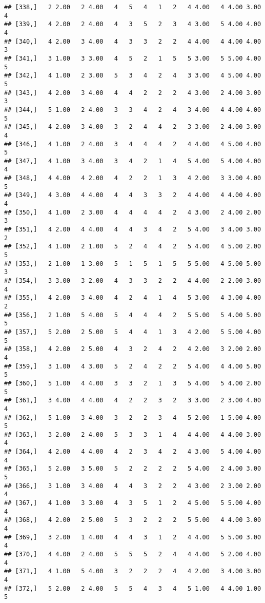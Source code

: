 \documentclass[]{article}
\begin{document}
\begin{verbatim}
## [338,]   2 2.00   2 4.00   4   5   4   1   2   4 4.00   4 4.00 3.00   4
## [339,]   4 2.00   2 4.00   4   3   5   2   3   4 3.00   5 4.00 4.00   4
## [340,]   4 2.00   3 4.00   4   3   3   2   2   4 4.00   4 4.00 4.00   3
## [341,]   3 1.00   3 3.00   4   5   2   1   5   5 3.00   5 5.00 4.00   5
## [342,]   4 1.00   2 3.00   5   3   4   2   4   3 3.00   4 5.00 4.00   5
## [343,]   4 2.00   3 4.00   4   4   2   2   2   4 3.00   2 4.00 3.00   3
## [344,]   5 1.00   2 4.00   3   3   4   2   4   3 4.00   4 4.00 4.00   5
## [345,]   4 2.00   3 4.00   3   2   4   4   2   3 3.00   2 4.00 3.00   4
## [346,]   4 1.00   2 4.00   3   4   4   4   2   4 4.00   4 5.00 4.00   5
## [347,]   4 1.00   3 4.00   3   4   2   1   4   5 4.00   5 4.00 4.00   4
## [348,]   4 4.00   4 2.00   4   2   2   1   3   4 2.00   3 3.00 4.00   5
## [349,]   4 3.00   4 4.00   4   4   3   3   2   4 4.00   4 4.00 4.00   4
## [350,]   4 1.00   2 3.00   4   4   4   4   2   4 3.00   2 4.00 2.00   3
## [351,]   4 2.00   4 4.00   4   4   3   4   2   5 4.00   3 4.00 3.00   2
## [352,]   4 1.00   2 1.00   5   2   4   4   2   5 4.00   4 5.00 2.00   5
## [353,]   2 1.00   1 3.00   5   1   5   1   5   5 5.00   4 5.00 5.00   3
## [354,]   3 3.00   3 2.00   4   3   3   2   2   4 4.00   2 2.00 3.00   4
## [355,]   4 2.00   3 4.00   4   2   4   1   4   5 3.00   4 3.00 4.00   2
## [356,]   2 1.00   5 4.00   5   4   4   4   2   5 5.00   5 4.00 5.00   5
## [357,]   5 2.00   2 5.00   5   4   4   1   3   4 2.00   5 5.00 4.00   5
## [358,]   4 2.00   2 5.00   4   3   2   4   2   4 2.00   3 2.00 2.00   4
## [359,]   3 1.00   4 3.00   5   2   4   2   2   5 4.00   4 4.00 5.00   5
## [360,]   5 1.00   4 4.00   3   3   2   1   3   5 4.00   5 4.00 2.00   5
## [361,]   3 4.00   4 4.00   4   2   2   3   2   3 3.00   2 3.00 4.00   4
## [362,]   5 1.00   3 4.00   3   2   2   3   4   5 2.00   1 5.00 4.00   5
## [363,]   3 2.00   2 4.00   5   3   3   1   4   4 4.00   4 4.00 3.00   4
## [364,]   4 2.00   4 4.00   4   2   3   4   2   4 3.00   5 4.00 4.00   4
## [365,]   5 2.00   3 5.00   5   2   2   2   2   5 4.00   2 4.00 3.00   5
## [366,]   3 1.00   3 4.00   4   4   3   2   2   4 3.00   2 3.00 2.00   4
## [367,]   4 1.00   3 3.00   4   3   5   1   2   4 5.00   5 5.00 4.00   4
## [368,]   4 2.00   2 5.00   5   3   2   2   2   5 5.00   4 4.00 3.00   4
## [369,]   3 2.00   1 4.00   4   4   3   1   2   4 4.00   5 5.00 3.00   4
## [370,]   4 4.00   2 4.00   5   5   5   2   4   4 4.00   5 2.00 4.00   4
## [371,]   4 1.00   5 4.00   3   2   2   2   4   4 2.00   3 4.00 3.00   4
## [372,]   5 2.00   2 4.00   5   5   4   3   4   5 1.00   4 4.00 1.00   5

\end{verbatim}
\end{document}
